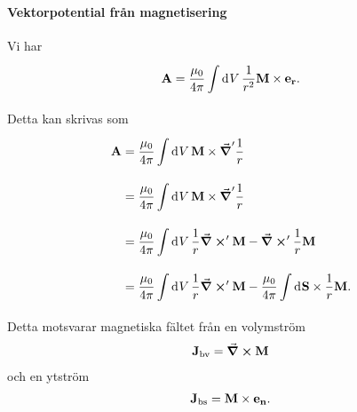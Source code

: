 \paragraph{Vektorpotential från magnetisering}
Vi har
\begin{align*}
	\vb{A} = \frac{\mu_{0}}{4\pi}\int\limits_{}^{}\dd[]{V}\frac{1}{r^{2}}\vb{M}\times\vb{e}_{\vb{r}}.
\end{align*}
Detta kan skrivas som
\begin{align*}
	\vb{A} &= \frac{\mu_{0}}{4\pi}\int\limits_{}^{}\dd[]{V}\vb{M}\times\grad'{\frac{1}{r}} \\
	       &= \frac{\mu_{0}}{4\pi}\int\limits_{}^{}\dd[]{V}\vb{M}\times\grad'{\frac{1}{r}} \\
	       &= \frac{\mu_{0}}{4\pi}\int\limits_{}^{}\dd[]{V}\frac{1}{r}\curl'{\vb{M}} - \curl'{\frac{1}{r}\vb{M}} \\
	       &= \frac{\mu_{0}}{4\pi}\int\limits_{}^{}\dd[]{V}\frac{1}{r}\curl'{\vb{M}} - \frac{\mu_{0}}{4\pi}\int\limits_{}^{}\dd[]{\vb{S}}\times\frac{1}{r}\vb{M}.
\end{align*}
Detta motsvarar magnetiska fältet från en volymström
\begin{align*}
	\vb{J}_{\text{bv}} = \curl{\vb{M}}
\end{align*}
och en ytström
\begin{align*}
	\vb{J}_{\text{bs}} = \vb{M}\times\vb{e}_{\vb{n}}.
\end{align*}